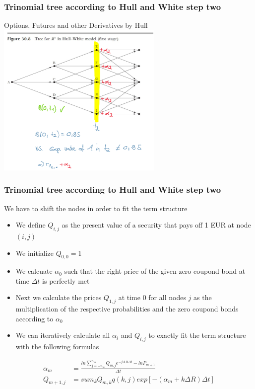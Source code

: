 \documentclass{beamer}
\begin{document}
	\begin{frame}
		\frametitle{Trinomial tree according to Hull and White step two}
		\begin{block}{Options, Futures and other Derivatives by Hull}
			\includegraphics[width=0.6\textwidth]{Trinomialbaum hull White step one Niklas alphas.png}
		\end{block}
	\end{frame}
	
	
	
	\begin{frame}
		\frametitle{Trinomial tree according to Hull and White step two} 
		\vspace{0.4cm}
		We have to shift the nodes in order to fit the term structure
		\begin{itemize}
			\item We define $Q_{i,j}$ as the present value of a security that pays off 1 EUR at node $(i,j)$
			\item We initialize $Q_{0,0} = 1$
			\item We calcuate $\alpha_0$ such that the right price of the given zero coupond bond at time $\Delta t$ is perfectly met
			\item Next we calculate the prices $Q_{1,j}$ at time 0 for all nodes $j$ as the multiplication of the respective probabilities and the zero coupond bonds according to $\alpha_0$
			\item We can iteratively calculate all $\alpha_i$ and $Q_{i,j}$ to exactly fit the term structure with the following formulas
		\end{itemize}
		
		\vspace{-0.6cm}
		
		\begin{align*}
		\alpha_m &= \frac{ln \sum_{j=-n_m}^{n_m} Q_{m,j} e^{-j\Delta R \Delta t} - ln P_{m+1}}{\Delta t}\\
		Q_{m+1,j} &= sum_k Q_{m,k}q(k,j) exp[-(\alpha_m + k \Delta R) \Delta t]
		\end{align*}
	\end{frame}
	
\end{document}
